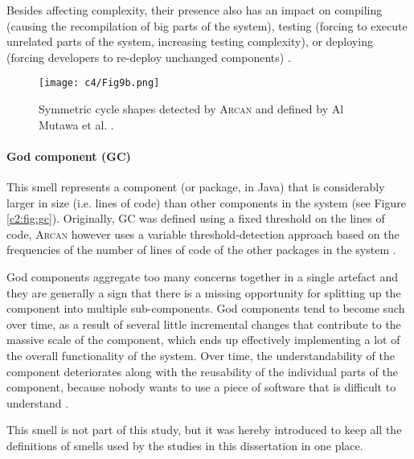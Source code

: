 Besides affecting complexity, their presence also has an impact on compiling (causing the recompilation of big parts of the system), testing (forcing to execute unrelated parts of the system, increasing testing complexity), or deploying (forcing developers to re-deploy unchanged components) \cite{Lippert2006}.

\begin{figure}[h]
    \centering
    \texttt{[image: c4/Fig9b.png]}
    \caption{Symmetric cycle shapes detected by \textsc{Arcan} and defined by Al Mutawa et al. \cite{AlMutawa2014}.}\label{c2:fig:cycle-shapes}
\end{figure}

\paragraph{God component (GC)}\label{c2:sec:arch-smells-gc}
This smell represents a component (or package, in Java) that is considerably larger in size (i.e. lines of code) than other components in the system \cite{Lippert2006} (see Figure \ref{c2:fig:gc}).
Originally, GC was defined using a fixed threshold on the lines of code, \textsc{Arcan} however uses a variable threshold-detection approach based on the frequencies of the number of lines of code of the other packages in the system \cite{Arcelli2015}.

God components aggregate too many concerns together in a single artefact and they are generally a sign that there is a missing opportunity for splitting up the component into multiple sub-components.
God components tend to become such over time, as a result of several little incremental changes that contribute to the massive scale of the component, which ends up effectively implementing a lot of the overall functionality of the system.
Over time, the understandability of the component deteriorates along with the reusability of the individual parts of the component, because nobody wants to use a piece of software that is difficult to understand \cite{Lippert2006}.

This smell is not part of this study, but it was hereby introduced to keep all the definitions of smells used by the studies in this dissertation in one place.

